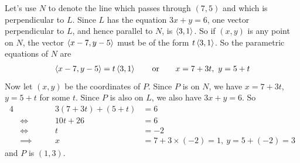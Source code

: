 \begin{eg}
Let's use $N$ to denote the line 
which passes through $(7,5)$ and which is perpendicular to $L$. 
Since $L$
has the equation $3x+y=6$, one vector perpendicular to $L$, and hence parallel
to $N$, is $\left< 3,1\right> $. So if $(x,y)$ is any point on $N$, the vector $\left< x-7,y-5\right> $
must be of the form $t\left< 3,1\right> $. So the parametric equations of $N$ are
\begin{align*}
\left< x-7,y-5\right> =t\left< 3,1\right> \qquad\text{or}\qquad
x=7+3t,\ y=5+t
\end{align*}
Now let $(x,y)$ be the coordinates of $P$. Since $P$ is on $N$,
we have $x=7+3t$, $y=5+t$ for some $t$. Since $P$ is also on $L$, we also
have $3x+y=6$. So
\begin{alignat*}{4}
& & 3(7+3t)+(5+t)&= 6\\
& \iff\qquad& 10t+26&= 6\\
& \iff\qquad& t&=-2\\
& \implies\qquad& x&= 7+3\times (-2)=1,\ y=5+(-2)=3
\end{alignat*}
and $P$ is $(1,3)$.

\end{eg}

